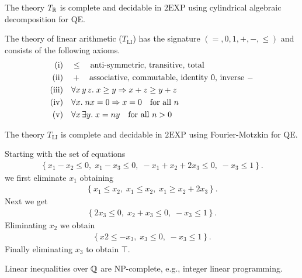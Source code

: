 \begin{theorem}
    The theory $T_{\mathbb{R}}$ is complete and decidable in $2\mathrm{EXP}$ using cylindrical algebraic decomposition for QE.
\end{theorem}


\begin{definition}[$T_{\mathrm{LI}}$]
    The theory of linear arithmetic ($T_{\mathrm{LI}}$) has the signature $(=, 0, 1, +, -,\leq)$ and consists of the following axioms.
      \begin{align*}
    \text{(i)}\quad& \leq \quad \text{anti-symmetric, transitive, total} \\
    \text{(ii)}\quad& + \quad \text{associative, commutable, identity $0$, inverse $-$} \\
    \text{(iii)}\quad&\forall x\, y\, z. \; x\geq y \Rightarrow x+z \geq y+z \\
    \text{(iv)}\quad&\forall x . \; nx=0 \Rightarrow x=0 \quad \text{for all $n$}\\
    \text{(v)}\quad&\forall x\, \exists y. \; x=ny \quad \text{for all $n>0$} \\
  \end{align*}      
\end{definition}

\begin{theorem}
    The theory $T_{\mathrm{LI}}$ is complete and decidable in  $2\mathrm{EXP}$ using Fourier-Motzkin for QE.
\end{theorem}


\begin{example}
Starting with the set of equations 
\begin{align*}
    \left\lbrace x_1 - x_2 \leq 0 , \;
    x_1 - x_3 \leq 0 ,\; 
-x_1 + x_2 + 2x_3 \leq 0 ,\;
-x_3 \leq 1\right\rbrace . 
\end{align*}
we first eliminate $x_1$ obtaining 
\begin{align*}
   \left\lbrace x_1 \leq x_2 ,\; x_1 \leq x_2 ,\;  x_1 \geq x_2 + 2 x_3 \right\rbrace .
\end{align*}
Next we get 
\begin{align*}
   \left\lbrace 
      2x_3\leq 0 ,\; 
    x_2 + x_3 \leq 0,\; 
    -x_3 \leq 1
   \right\rbrace .
\end{align*}
Eliminating $x_2$ we obtain
\begin{align*}
   \left\lbrace 
      x2\leq -x_3 ,\; 
     x_3 \leq 0,\; 
    -x_3 \leq 1
   \right\rbrace.
\end{align*}
Finally eliminating $x_3$ to obtain $\top$. 
\end{example}

\begin{remark}
    Linear inequalities over $\mathbb{Q}$ are $\mathrm{NP}$-complete, e.g., integer linear programming. 
\end{remark}
